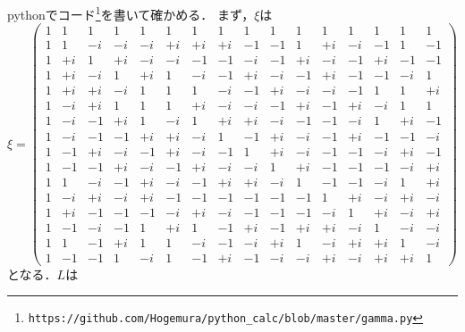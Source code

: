 pythonでコード\footnote{\verb|https://github.com/Hogemura/python_calc/blob/master/gamma.py|}を書いて確かめる．
まず，$\xi$は
\[\xi =
\begin{pmatrix}
  1 & 1 & 1 & 1 & 1 & 1 & 1 & 1 & 1 & 1 & 1 & 1 & 1 & 1 & 1 & 1 \\
  1 & 1 &  - i &  - i &  - i &  + i &  + i &  + i &  - 1 &  - 1 & 1 &  + i &  - i &  - 1 & 1 &  - 1 \\
  1 &  + i & 1 &  + i &  - i &  - i &  - 1 &  - 1 &  - i &  - 1 &  + i &  - i &  - 1 &  + i &  - 1 &  - 1 \\
  1 &  + i &  - i & 1 &  + i & 1 &  - i &  - 1 &  + i &  - i &  - 1 &  + i &  - 1 &  - 1 &  - i & 1 \\
  1 &  + i &  + i &  - i & 1 & 1 & 1 &  - i &  - 1 &  + i &  - i &  - i &  - 1 & 1 & 1 &  + i \\
  1 &  - i &  + i & 1 & 1 & 1 &  + i &  - i &  - i &  - 1 &  + i &  - 1 &  + i &  - i & 1 & 1 \\
  1 &  - i &  - 1 &  + i & 1 &  - i & 1 &  + i &  + i &  - i &  - 1 &  - 1 &  - i & 1 &  + i &  - 1 \\
  1 &  - i &  - 1 &  - 1 &  + i &  + i &  - i & 1 &  - 1 &  + i &  - i &  - 1 &  + i &  - 1 &  - 1 &  - i \\
  1 &  - 1 &  + i &  - i &  - 1 &  + i &  - i &  - 1 & 1 &  + i &  - i &  - 1 &  - 1 &  - i &  + i &  - 1 \\
  1 &  - 1 &  - 1 &  + i &  - i &  - 1 &  + i &  - i &  - i & 1 &  + i &  - 1 &  - 1 &  - 1 &  - i &  + i \\
  1 & 1 &  - i &  - 1 &  + i &  - i &  - 1 &  + i &  + i &  - i & 1 &  - 1 &  - 1 &  - i & 1 &  + i \\
  1 &  - i &  + i &  - i &  + i &  - 1 &  - 1 &  - 1 &  - 1 &  - 1 &  - 1 & 1 &  + i &  - i &  + i &  - i \\
  1 &  + i &  - 1 &  - 1 &  - 1 &  - i &  + i &  - i &  - 1 &  - 1 &  - 1 &  - i & 1 &  + i &  - i &  + i \\
  1 &  - 1 &  - i &  - 1 & 1 &  + i & 1 &  - 1 &  + i &  - 1 &  + i &  + i &  - i & 1 &  - i &  - i \\
  1 & 1 &  - 1 &  + i & 1 & 1 &  - i &  - 1 &  - i &  + i & 1 &  - i &  + i &  + i & 1 &  - i \\
  1 &  - 1 &  - 1 & 1 &  - i & 1 &  - 1 &  + i &  - 1 &  - i &  - i &  + i &  - i &  + i &  + i & 1
\end{pmatrix}
\]
となる．$L$は
